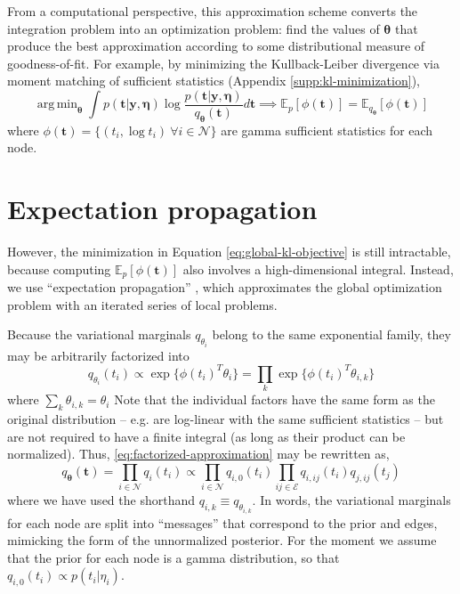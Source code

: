 \documentclass{article}
\DeclareMathOperator*{\argmin}{arg\,min}
\begin{document}
From a computational perspective, this approximation scheme converts the integration problem into an optimization problem: find the values of $\bm \theta$ that produce the best approximation according to some distributional measure of goodness-of-fit. For example, by minimizing the Kullback-Leiber divergence via moment matching of sufficient statistics (Appendix \ref{supp:kl-minimization}),
\begin{equation}
\label{eq:global-kl-objective}
\argmin_{\bm \theta} \int p(\bm t | \bm y , \bm \eta) \log \frac{p(\bm t | \bm y , \bm \eta)}{q_{\bm \theta}(\bm t)} d\bm t \implies \mathbb{E}_p[\phi(\bm t)] = \mathbb{E}_{q_{\bm \theta}}[\phi(\bm t)]
\end{equation}
where $\phi(\bm t) = \{(t_i, \log t_i)~\forall i \in \mathcal{N}\}$ are gamma sufficient statistics for each node.

\section{Expectation propagation}

However, the minimization in Equation \ref{eq:global-kl-objective} is still intractable, because computing $\mathbb{E}_p[\phi(\bm t)]$ also involves a high-dimensional integral. Instead, we use ``expectation propagation'' \cite{minka2002expectation}, which approximates the global optimization problem with an iterated series of local problems.

Because the variational marginals $q_{\theta_i}$ belong to the same exponential family, they may be arbitrarily factorized into
\[
q_{\theta_i}(t_i) \propto \exp\{ \phi(t_i)^T \theta_i \} = \prod_k \exp\{\phi(t_i)^T \theta_{i,k}  \}    
\]
where $\sum_k \theta_{i,k} = \theta_i$ Note that the individual factors have the same form as the original distribution -- e.g. are log-linear with the same sufficient statistics -- but are not required to have a finite integral (as long as their product can be normalized). Thus, \ref{eq:factorized-approximation} may be rewritten as,
\[
q_{\bm \theta}(\bm t) = \prod_{i \in \mathcal{N}} q_i(t_i) \propto \prod_{i \in \mathcal{N}} q_{i,0}(t_i) \prod_{ij \in \mathcal{E}} q_{i,ij}(t_i) q_{j,ij}(t_j)
\]
where we have used the shorthand $q_{i,k} \equiv q_{\theta_{i,k}}$. In words, the variational marginals for each node are split into ``messages'' that correspond to the prior and edges, mimicking the form of the unnormalized posterior. For the moment we assume that the prior for each node is a gamma distribution, so that $q_{i,0}(t_i) \propto p(t_i | \eta_i)$. 
\end{document}
